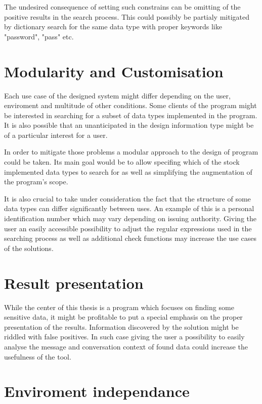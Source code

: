 \documentclass[a4paper,twoside,12pt]{book}
\begin{document}
The undesired consequence of setting such constrains can be omitting of the positive results in the search process. This could possibly be
partialy mitigated by dictionary search for the same data type with proper keywords like "password", "pass" etc. 


\section{Modularity and Customisation}

Each use case of the designed system might differ depending on the user, enviroment and multitude of other conditions. 
Some clients of the program might be interested in searching for a subset of data types implemented in the program. It is
also possible that an unanticipated in the design information type might be of a particular interest for a user. 

In order to mitigate those problems a modular approach to the design of program could be taken. Its main goal would be to allow specifing
which of the stock implemented data types to search for as well as simplifying the augmentation of the program's scope.

It is also crucial to take under consideration the fact that the structure of some data types can differ significantly between uses.
An example of this is a personal identification number which may vary depending on issuing authority. Giving the user an easily accessible possibility to 
adjust the regular expressions used in the searching process as well as additional check functions may increase the use cases of the solutions.

\section{Result presentation}

While the center of this thesis is a program which focuses on finding some sensitive data, it might be profitable to put a special emphasis on the proper
presentation of the results. Information discovered by the solution might be riddled with false positives. In such case giving the user a possibility
to easily analyse the message and conversation context of found data could increase the usefulness of the tool. 

\section{Enviroment independance}
\end{document}
